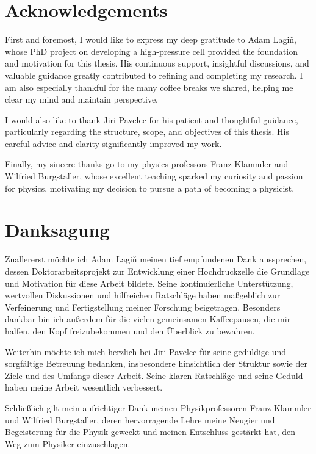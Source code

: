 \section*{Acknowledgements}
First and foremost, I would like to express my deep gratitude to Adam Lagiň, whose PhD project on developing a high-pressure cell provided the foundation and motivation for this thesis. His continuous support, insightful discussions, and valuable guidance greatly contributed to refining and completing my research. I am also especially thankful for the many coffee breaks we shared, helping me clear my mind and maintain perspective.

\vspace{0.5cm}

I would also like to thank Jiri Pavelec for his patient and thoughtful guidance, particularly regarding the structure, scope, and objectives of this thesis. His careful advice and clarity significantly improved my work.

\vspace{0.5cm}

Finally, my sincere thanks go to my physics professors Franz Klammler and Wilfried Burgstaller, whose excellent teaching sparked my curiosity and passion for physics, motivating my decision to pursue a path of becoming a physicist.

\blankpage

\section*{Danksagung}
Zuallererst möchte ich Adam Lagiň meinen tief empfundenen Dank aussprechen, dessen Doktorarbeitsprojekt zur Entwicklung einer Hochdruckzelle die Grundlage und Motivation für diese Arbeit bildete. Seine kontinuierliche Unterstützung, wertvollen Diskussionen und hilfreichen Ratschläge haben maßgeblich zur Verfeinerung und Fertigstellung meiner Forschung beigetragen. Besonders dankbar bin ich außerdem für die vielen gemeinsamen Kaffeepausen, die mir halfen, den Kopf freizubekommen und den Überblick zu bewahren.

\vspace{0.5cm}

Weiterhin möchte ich mich herzlich bei Jiri Pavelec für seine geduldige und sorgfältige Betreuung bedanken, insbesondere hinsichtlich der Struktur sowie der Ziele und des Umfangs dieser Arbeit. Seine klaren Ratschläge und seine Geduld haben meine Arbeit wesentlich verbessert.

\vspace{0.5cm}

Schließlich gilt mein aufrichtiger Dank meinen Physikprofessoren Franz Klammler und Wilfried Burgstaller, deren hervorragende Lehre meine Neugier und Begeisterung für die Physik geweckt und meinen Entschluss gestärkt hat, den Weg zum Physiker einzuschlagen.
\blankpage
